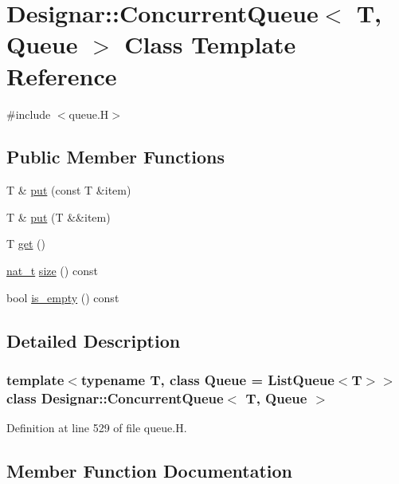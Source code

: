 \hypertarget{class_designar_1_1_concurrent_queue}{}\section{Designar\+:\+:Concurrent\+Queue$<$ T, Queue $>$ Class Template Reference}
\label{class_designar_1_1_concurrent_queue}


{\ttfamily \#include $<$queue.\+H$>$}

\subsection*{Public Member Functions}
\begin{DoxyCompactItemize}
\item 
T \& \hyperlink{class_designar_1_1_concurrent_queue_a0ed3cfb2755c04be0f55f485b71637b9}{put} (const T \&item)
\item 
T \& \hyperlink{class_designar_1_1_concurrent_queue_aacc6c771061780c42058303f300b5acb}{put} (T \&\&item)
\item 
T \hyperlink{class_designar_1_1_concurrent_queue_aa4d86422e2ed7f70e2ad87e66f1864d5}{get} ()
\item 
\hyperlink{namespace_designar_aa72662848b9f4815e7bf31a7cf3e33d1}{nat\+\_\+t} \hyperlink{class_designar_1_1_concurrent_queue_acbeaea381f53471ea17366ab7a5fc52d}{size} () const
\item 
bool \hyperlink{class_designar_1_1_concurrent_queue_a7e73feaae8bc8aae37145a2484f28ea2}{is\+\_\+empty} () const
\end{DoxyCompactItemize}


\subsection{Detailed Description}
\subsubsection*{template$<$typename T, class Queue = List\+Queue$<$\+T$>$$>$\newline
class Designar\+::\+Concurrent\+Queue$<$ T, Queue $>$}



Definition at line 529 of file queue.\+H.



\subsection{Member Function Documentation}
\mbox{\label{class_designar_1_1_concurrent_queue_aa4d86422e2ed7f70e2ad87e66f1864d5}} 
